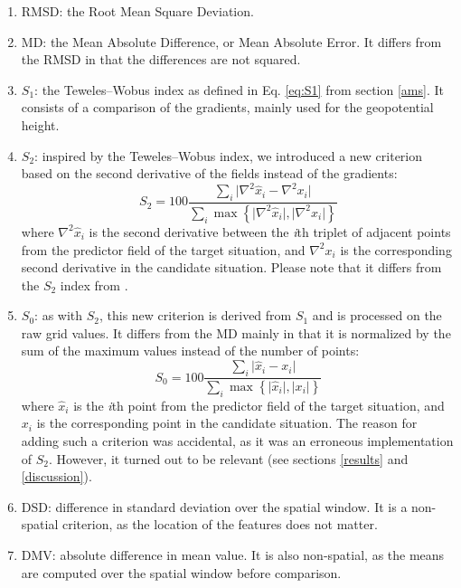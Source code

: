 \documentclass[draft]{agujournal2019}
\begin{document}
\begin{enumerate}
	\item RMSD: the Root Mean Square Deviation.
	\item MD: the Mean Absolute Difference, or Mean Absolute Error. It differs from the RMSD in that the differences are not squared.
	\item $S_{1}$: the Teweles--Wobus index as defined in Eq. \ref{eq:S1} from section \ref{ams}. It consists of a comparison of the gradients, mainly used for the geopotential height.
	\item $S_{2}$: inspired by the Teweles--Wobus index, we introduced a new criterion based on the second derivative of the fields instead of the gradients:
	\begin{equation}
		\label{eq:S2}
		S_{2}=100 \frac {\displaystyle 
            \sum_{i} \vert \nabla^{2}\hat{x}_{i} - 
            \nabla^{2} x_{i} \vert
        }
		{\displaystyle 
            \sum_{i} \max\left\lbrace 
                \vert \nabla^{2}\hat{x}_{i} \vert , 
                \vert \nabla^{2} x_{i} \vert 
            \right\rbrace 
        }
	\end{equation}
	where $\nabla^{2} \hat{x}_{i}$ is the second derivative between the \textit{i}th triplet of adjacent points from the predictor field of the target situation, and $\nabla^{2} x_{i}$ is the corresponding second derivative in the candidate situation.
 Please note that it differs from the $S_{2}$ index from .
	\item $S_{0}$: as with $S_{2}$, this new criterion is derived from $S_{1}$ and is processed on the raw grid values. It differs from the MD mainly in that it is normalized by the sum of the maximum values instead of the number of points:
	\begin{equation}
		\label{eq:S0}
		S_{0}=100 \frac {\displaystyle 
            \sum_{i} \vert \hat{x}_{i} - 
            x_{i} \vert
        }
		{\displaystyle 
            \sum_{i} \max\left\lbrace 
                \vert \hat{x}_{i} \vert , 
                \vert x_{i} \vert 
            \right\rbrace 
        }
	\end{equation}
	where $\hat{x}_{i}$ is the \textit{i}th point from the predictor field of the target situation, and $x_{i}$ is the corresponding point in the candidate situation. The reason for adding such a criterion was accidental, as it was an erroneous implementation of $S_{2}$. However, it turned out to be relevant (see sections \ref{results} and \ref{discussion}).
	\item DSD: difference in standard deviation over the spatial window. It is a non-spatial criterion, as the location of the features does not matter.
	\item DMV: absolute difference in mean value. It is also non-spatial, as the means are computed over the spatial window before comparison.
\end{enumerate}
\end{document}
